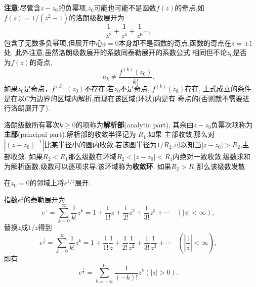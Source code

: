 \textbf{注意}:尽管含$z-z_0$的负幂项,$z_0$可能也可能不是函数$f(z)$的奇点,如$f(z) = 1/(z^2-1)$的洛朗级数展开为
$$
\frac{1}{z^2} + \frac{1}{z^4} + \frac{1}{z^6}\cdots,
$$
包含了无数多负幂项,但展开中心$z=0$本身却不是函数的奇点,函数的奇点在$z=\pm 1$处. 此外注意,虽然洛朗级数展开的系数同泰勒展开的系数公式
相同但不论$z_0$是否为$f(z)$的奇点,
$$a_k \neq \frac{f^{(k)}(z_0)}{k!}.
$$
如果$z_0$是奇点，$f^{(k)}(z_0)$不存在;若$z_0$不是奇点, $f^{(k)}(z_0)$存在, 上式成立的条件是在以$C$为边界的区域内解析,而现在该区域(环状)内是有
奇点的(否则就不需要进行洛朗展开了).

洛朗级数所有幂次$k\geq 0$的项称为\textbf{解析部}(analytic part), 其余由$z-z_0$负幂次项称为\textbf{主部}(principal part).解析部的收敛半径记为
$R_1$.如果
主部收敛,那么对$|(z-z_0)^{-1}|$比某半径小的圆内收敛.若该圆半径为$1/R_2$,可以知当$|z-z_0|> R_2$,主部收敛.
如果$R_2 < R_1$那么级数在环域$R_2 < |z- z_0| < R_1$内绝对一致收敛,级数求和为解析函数,级数可以逐项求导.该环域称为\textbf{收敛环}.
如果$R_2 > R_1$那么该级数发散.

\begin{example}
在$z_0 = 0$的邻域上将$e^{1/z}$展开.
\end{example}
\begin{solution}
指数$e^z$的泰勒展开为
\[
    e^z=\sum_{k=0}^{\infty} \frac{1}{k !} z^k=1+\frac{1}{1 !} z+\frac{1}{2 !} z^2+\frac{1}{3 !} z^3+\cdots \quad(|z|<\infty),    
\]
替换$z$成$1/z$得到
\[
    e^{\frac{1}{z}}=\sum_{k=0}^{\infty} \frac{1}{k !} z^k=1+\frac{1}{1 !} \frac{1}{z}+\frac{1}{2 !} \frac{1}{z^2}+\frac{1}{3 !} \frac{1}{z^3}+\cdots \quad(|\frac{1}{z}|<\infty),    
\]
即有
\[
e^{\frac{1}{z}} = \sum_{k=-\infty}^{0} \frac{1}{(-k)!} z^k ( |z| > 0) .
\]
\end{solution}